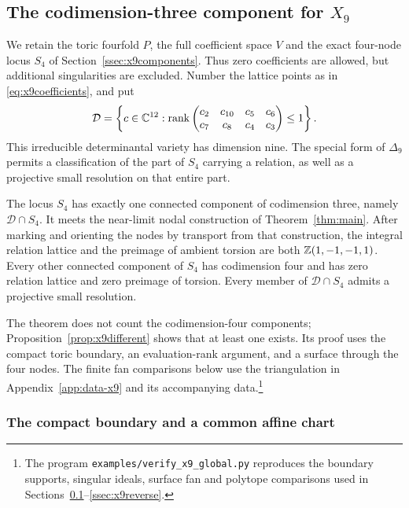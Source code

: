 \subsection{The codimension-three component for \texorpdfstring{$X_9$}{X9}}
\label{ssec:x9global}

We retain the toric fourfold $P$, the full coefficient space $V$ and the
exact four-node locus $S_4$ of Section~\ref{ssec:x9components}. Thus zero
coefficients are allowed, but additional singularities are excluded.
Number the lattice points as in \eqref{eq:x9coefficients}, and put
\begin{equation}\label{eq:x9determinantal}
 \mathcal D=\left\{c\in\mathbb C^{12}:\operatorname{rank}
 \begin{pmatrix}c_2&c_{10}&c_5&c_6\\c_7&c_8&c_4&c_3\end{pmatrix}
 \leq1\right\}.
\end{equation}
This irreducible determinantal variety has dimension nine. The special
form of $\Delta_9$ permits a classification of the part of $S_4$ carrying
a relation, as well as a projective small resolution on that entire part.

\begin{theorem}\label{thm:x9global}
The locus $S_4$ has exactly one connected component of codimension three,
namely $\mathcal D\cap S_4$. It meets the near-limit nodal construction of
Theorem~\ref{thm:main}. After marking and orienting the nodes by transport
from that construction, the integral relation lattice and the preimage of
ambient torsion are both $\mathbb Z(1,-1,-1,1)$.
Every other connected component of $S_4$ has codimension four and has
zero relation lattice and zero preimage of torsion. Every member of
$\mathcal D\cap S_4$ admits a projective small resolution.
\end{theorem}

The theorem does not count the codimension-four components;
Proposition~\ref{prop:x9different} shows that at least one exists. Its proof
uses the compact toric boundary, an evaluation-rank argument, and a
surface through the four nodes. The finite fan comparisons below use the
triangulation in Appendix~\ref{app:data-x9} and its accompanying data.\footnote{The
program \texttt{examples/verify\_x9\_global.py} reproduces the boundary
supports, singular ideals, surface fan and polytope comparisons used in
Sections~\ref{ssec:x9global}--\ref{ssec:x9reverse}.}

\subsubsection*{The compact boundary and a common affine chart}

